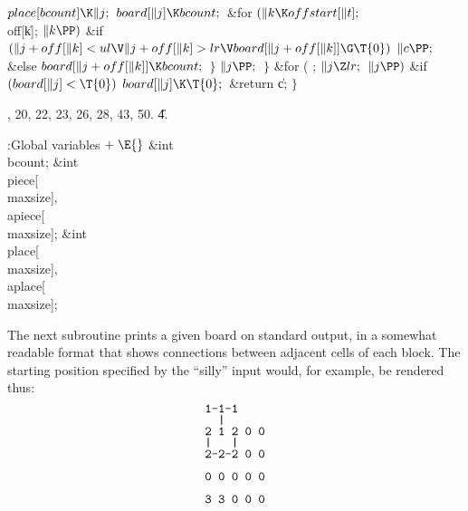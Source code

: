 ${}\\{place}[\\{bcount}]\K\|j;{}$\6
${}\\{board}[\|j]\K\\{bcount};{}$\6
\&{for} ${}(\|k\K\\{offstart}[\|t];{}$ \\{off}[\|k]; ${}\|k\PP){}$\1\6
\&{if} ${}(\|j+\\{off}[\|k]<\\{ul}\V\|j+\\{off}[\|k]>\\{lr}\V\\{board}[\|j+%
\\{off}[\|k]]\G\T{0}){}$\1\5
${}\|c\PP;{}$\2\6
\&{else}\1\5
${}\\{board}[\|j+\\{off}[\|k]]\K\\{bcount};{}$\2\2\6
\4${}\}{}$\2\6
${}\|j\PP;{}$\6
\4${}\}{}$\2\6
\&{for} ( ; ${}\|j\Z\\{lr};{}$ ${}\|j\PP){}$\1\6
\&{if} ${}(\\{board}[\|j]<\T{0}){}$\1\5
${}\\{board}[\|j]\K\T{0};{}$\2\2\6
\&{return} \|c;\6
\4${}\}{}$\2\par
{}, 20, 22, 23, 26, 28, 43, 50.
\U4.\fi

\B{}:Global variables\X${}\mathrel+\E{}$\6
\&{int} \\{bcount};\6
\&{int} \\{piece}[\\{maxsize}]${},{}$ \\{apiece}[\\{maxsize}];\6
\&{int} \\{place}[\\{maxsize}]${},{}$ \\{aplace}[\\{maxsize}];\par
\fi

The next subroutine prints a given board on standard output,
in a somewhat readable format that shows connections between
adjacent cells of each block. The starting position
specified by the ``silly'' input would, for example, be rendered thus:
$$\catcode`\!=\active \chardef!="7C %
\obeyspaces
\vbox{\baselineskip=9pt\halign{\tt#\hfill\cr
1-1-1\cr
{}  !\cr
2 1 2 0 0\cr
!   !\cr
2-2-2 0 0\cr
\cr
0 0 0 0 0\cr
\cr
3 3 0 0 0\cr}}$$

